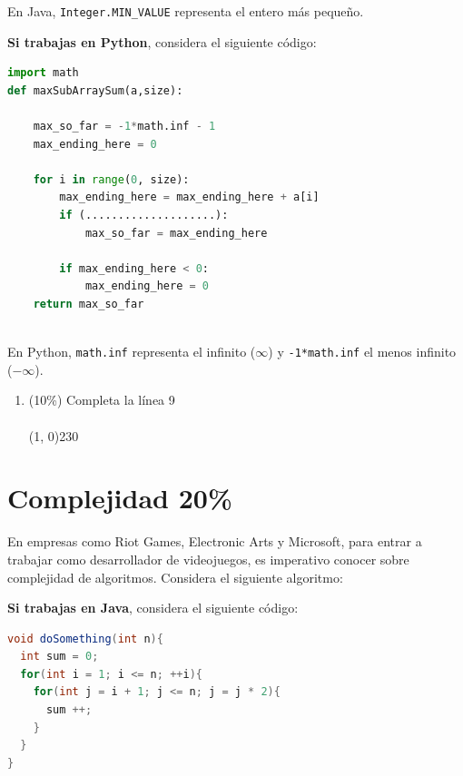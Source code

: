 \documentclass[10 pt]{article}
\begin{document}
En Java, \texttt{Integer.MIN\_VALUE} representa el entero más pequeño.

\hspace{1cm}

\textbf{Si trabajas en Python}, considera el siguiente código:

\begin{lstlisting}[language=Python]
import math
def maxSubArraySum(a,size):
      
    max_so_far = -1*math.inf - 1
    max_ending_here = 0
      
    for i in range(0, size):
        max_ending_here = max_ending_here + a[i]
        if (....................):
            max_so_far = max_ending_here
 
        if max_ending_here < 0:
            max_ending_here = 0  
    return max_so_far
  
\end{lstlisting}

En Python, \texttt{math.inf} representa el infinito ($\infty$) y \texttt{-1*math.inf} el menos infinito ($-\infty$).

  \begin{enumerate}[label=(\Alph*)]
    \item (10\%) Completa la línea 9\\ \\
    \line(1, 0){230}
    
  \end{enumerate}


\newpage

\section{Complejidad 20\%}
En empresas como Riot Games, Electronic Arts y Microsoft, para entrar a trabajar como desarrollador de videojuegos, es imperativo conocer sobre complejidad de algoritmos. Considera el siguiente algoritmo:

\hspace{1cm}

\textbf{Si trabajas en Java}, considera el siguiente código:

\begin{lstlisting}[language=Java]
void doSomething(int n){
  int sum = 0;
  for(int i = 1; i <= n; ++i){
    for(int j = i + 1; j <= n; j = j * 2){
      sum ++;
    }
  }
}
\end{lstlisting}
\end{document}
